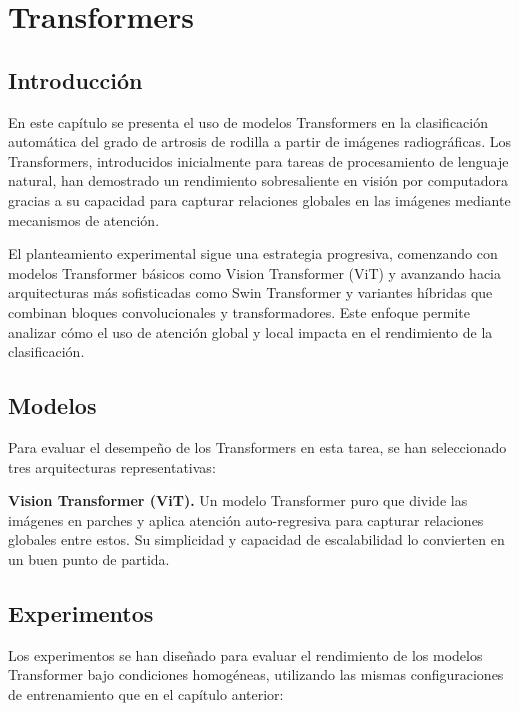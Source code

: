 \documentclass[11pt,spanish,listoffigures,listoftables]{tfgetsinf}
\begin{document}

\chapter{Transformers}
\label{chap:transformers}

\section{Introducción}
En este capítulo se presenta el uso de modelos Transformers en la clasificación automática del grado de artrosis de rodilla a partir de imágenes radiográficas. Los Transformers, 
introducidos inicialmente para tareas de procesamiento de lenguaje natural, han demostrado un rendimiento sobresaliente en visión por computadora gracias a su capacidad para capturar 
relaciones globales en las imágenes mediante mecanismos de atención.

El planteamiento experimental sigue una estrategia progresiva, comenzando con modelos Transformer básicos como Vision Transformer (ViT) y avanzando hacia arquitecturas más sofisticadas 
como Swin Transformer y variantes híbridas que combinan bloques convolucionales y transformadores. Este enfoque permite analizar cómo el uso de atención global y local impacta en el 
rendimiento de la clasificación.

\section{Modelos}
Para evaluar el desempeño de los Transformers en esta tarea, se han seleccionado tres arquitecturas representativas:

\textbf{Vision Transformer (ViT).}
Un modelo Transformer puro que divide las imágenes en parches y aplica atención auto-regresiva para capturar relaciones globales entre estos. Su simplicidad y 
capacidad de escalabilidad lo convierten en un buen punto de partida.


\section{Experimentos}
Los experimentos se han diseñado para evaluar el rendimiento de los modelos Transformer bajo condiciones homogéneas, utilizando las mismas configuraciones de entrenamiento que en el capítulo anterior:
\end{document}
